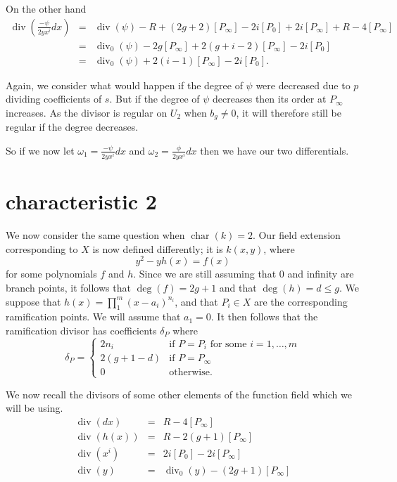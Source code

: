 \documentclass[draft, 11pt]{article} %
\theoremstyle{plain}
\theoremstyle{remark}
\DeclareMathOperator{\di}{div}
\DeclareMathOperator{\cha}{char}
\begin{document}
On the other hand
\begin{eqnarray*}
\di \left( \frac{-\psi}{2yx^i}dx\right) & = & \di (\psi ) -R + (2g+2)[P_\infty] - 2i[P_0] + 2i[P_\infty] + R -4[P_\infty] \\
& = & \di_0(\psi) - 2g[P_\infty] + 2(g+i-2)[P_\infty] -2i[P_0] \\
& = & \di_0(\psi) + 2(i-1)[P_\infty] - 2i[P_0].
\end{eqnarray*}

Again, we consider what would happen if the degree of $\psi$ were decreased due to $p$ dividing coefficients of $s$.
But if the degree of $\psi$ decreases then its order at $P_\infty$ increases.
As the divisor is regular on $U_2$ when $b_g \neq 0$, it will therefore still be regular if the degree decreases.


So if we now let $\omega_1 = \frac{-\psi}{2yx^i}dx$ and $\omega_2 = \frac{\phi}{2yx^i}dx$ then we have our two differentials.

\newpage

\section{characteristic 2}

We now consider the same question when $\cha (k) = 2$.
Our field extension corresponding to $X$ is now defined differently; it is $k(x,y)$, where
\[
y^2 - yh(x) = f(x)
\]
for some polynomials $f$ and $h$.
Since we are still assuming that $0$ and infinity are branch points, it follows that $\deg(f) = 2g+1$ and that $\deg(h)  = d  \leq g$. 
We suppose that $h(x) = \prod_1^m (x-a_i)^{n_i}$, and that $P_i\in X$ are the corresponding ramification points.
We will assume that $a_1 = 0$.
It then follows that the ramification divisor has coefficients $\delta_P$ where
\[
\delta_P = \left \{ \begin{array}{ll}
2n_i & \text{if } P= P_i \text{ for some } i=1, \ldots , m \\
2(g+1-d) & \text{if } P=P_\infty \\
0 & \text{otherwise.}
\end{array}
\right.
\]


We now recall the divisors of some other elements of the function field which we will be using.
\begin{eqnarray*}
\di (dx) & = & R - 4[P_\infty] \\
\di (h(x)) & = & R - 2(g+1)[P_\infty] \\
\di (x^i) & = & 2i[P_0] - 2i[P_\infty]\\
\di (y) & = & \di_0(y) - (2g+1)[P_\infty]
\end{eqnarray*}
\end{document}
